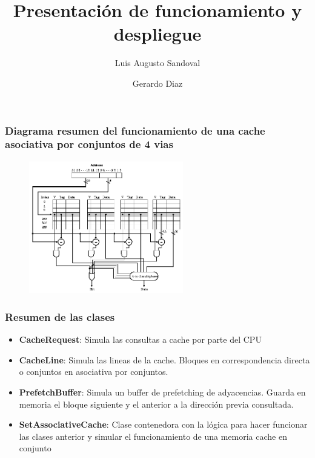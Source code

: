\documentclass[11pt]{beamer}
\begin{document}
	\author{Luis Augusto Sandoval \and Gerardo Diaz}
	\title{Presentación de funcionamiento y despliegue}
	\begin{frame}[plain]
		\maketitle
	\end{frame}
	
	\begin{frame}
		\frametitle{Diagrama resumen del funcionamiento de una cache asociativa por conjuntos de 4 vias}
		\begin{figure}
			\includegraphics[width=0.6\textwidth]{setAssociative.png}
		\end{figure}
	\end{frame}
	
	\begin{frame}
		\frametitle{Resumen de las clases}
		\begin{itemize}
			\item \textbf{CacheRequest}: Simula las consultas a cache por parte del CPU
			\item \textbf{CacheLine}: Simula las lineas de la cache. Bloques en correspondencia directa o conjuntos en asociativa por conjuntos.
			\item \textbf{PrefetchBuffer}: Simula un buffer de prefetching de adyacencias. Guarda en memoria el bloque siguiente y el anterior a la dirección previa consultada.
			\item \textbf{SetAssociativeCache}: Clase contenedora con la lógica para hacer funcionar las clases anterior y simular el funcionamiento de una memoria cache en conjunto
		\end{itemize}
	\end{frame}
	
\end{document}
